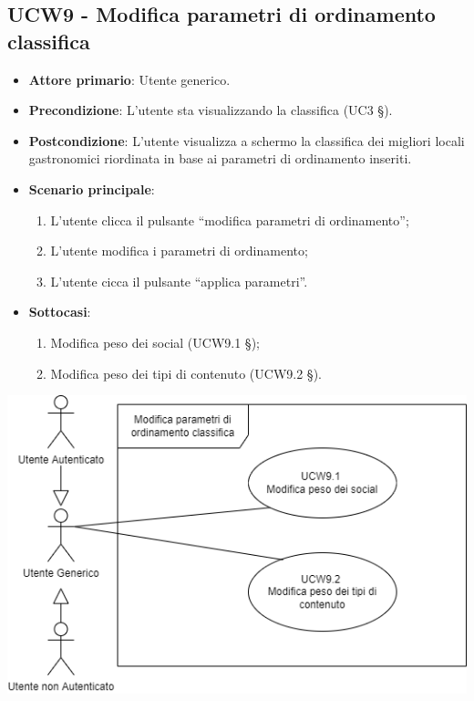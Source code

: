 \subsection{UCW9 - Modifica parametri di ordinamento classifica}

\begin{itemize}
    \item \textbf{Attore primario}: Utente generico.
    \item \textbf{Precondizione}: L’utente sta visualizzando la classifica (UC3 §).
    \item \textbf{Postcondizione}: L’utente visualizza a schermo la classifica dei migliori locali gastronomici riordinata in base ai parametri di ordinamento inseriti.
    \item \textbf{Scenario principale}: 
    \begin{enumerate}
        \item L’utente clicca il pulsante “modifica parametri di ordinamento”;
        \item L’utente modifica i parametri di ordinamento;
        \item L’utente cicca il pulsante “applica parametri”.
    \end{enumerate}

    \item \textbf{Sottocasi}:
    \begin{enumerate}
        \item Modifica peso dei social (UCW9.1 §);
        \item Modifica peso dei tipi di contenuto (UCW9.2 §).
    \end{enumerate}

\end{itemize}

\begin{center}
    \includegraphics[scale=0.5]{UC_images/UCW9.png}
\end{center}

